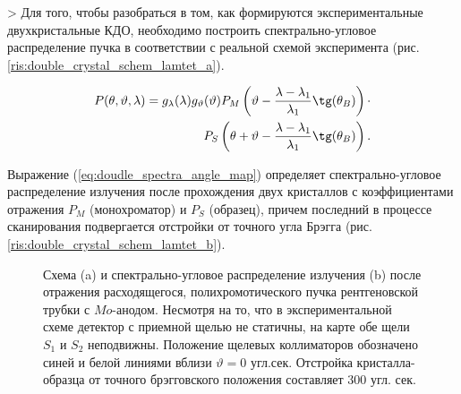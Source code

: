 >
Для того, чтобы разобраться в том, как формируются экспериментальные
двухкристальные КДО, необходимо построить спектрально-угловое распределение пучка
в соответствии с реальной схемой эксперимента (рис. \ref{ris:double_crystal_schem_lamtet_a}).

\begin{eqnarray} \label{eq:doudle_spectra_angle_map}
  P(\theta,\vartheta,\lambda) = g_{\lambda}(\lambda)g_{\vartheta}(\vartheta) P_M \left(\vartheta - \frac{\lambda - \lambda_1}{\lambda_1}\tg(\theta_B) \right) \cdot \nonumber \\
   P_S \left(\theta + \vartheta - \frac{\lambda - \lambda_1}{\lambda_1}\tg(\theta_B)\right).
 \end{eqnarray}

Выражение (\ref{eq:doudle_spectra_angle_map}) определяет спектрально-угловое распределение излучения после прохождения двух кристаллов с
коэффициентами отражения  $P_M$ (монохроматор) и $P_S$ (образец), причем последний в процессе сканирования подвергается отстройки от точного угла Брэгга
 (рис. \ref{ris:double_crystal_schem_lamtet_b}).

\begin{figure}[H]
  \centering
  \hfill

  \caption{Схема (a) и спектрально-угловое распределение излучения (b) после
  отражения расходящегося, полихромотического пучка рентгеновской трубки с $Mo$-анодом.
  Несмотря на то, что в экспериментальной схеме детектор с приемной
   щелью не статичны, на карте обе щели $S_1$ и $S_2$ неподвижны.
  Положение щелевых коллиматоров обозначено синей и белой линиями
  вблизи $\vartheta = 0$ угл.сек. Отстройка кристалла-образца от
  точного брэгговского положения составляет 300 угл. сек. }
  \label{ris:double_crystal_schem_lamtet}
\end{figure}

